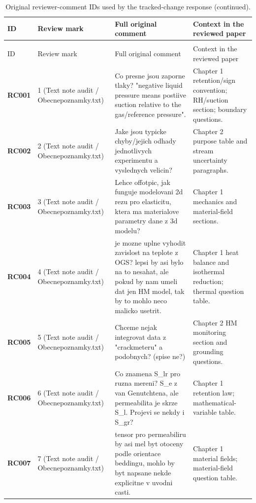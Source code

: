 \begin{longtable}{@{}L{0.10\textwidth} L{0.14\textwidth} L{0.31\textwidth} L{0.37\textwidth}@{}}
\caption{Original reviewer-comment IDs used by the tracked-change response.}\label{tab:original-review-comment-register}\\
\toprule
ID & Review mark & Full original comment & Context in the reviewed paper\\
\midrule
\endfirsthead
\caption[]{Original reviewer-comment IDs used by the tracked-change response (continued).}\\
\toprule
ID & Review mark & Full original comment & Context in the reviewed paper\\
\midrule
\endhead
\bottomrule
\endlastfoot
\textbf{RC001} & 1 (Text note audit / Obecnepoznamky.txt) & Co presne jsou zaporne tlaky? "negative liquid pressure means postiive suction relative to the gas/reference pressure". & Chapter 1 retention/sign convention; RH/suction section; boundary questions.\\
\addlinespace[0.16em]
\textbf{RC002} & 2 (Text note audit / Obecnepoznamky.txt) & Jake jsou typicke chyby/jejich odhady jednotlivych experimentu a vyslednych velicin? & Chapter 2 purpose table and stream uncertainty paragraphs.\\
\addlinespace[0.16em]
\textbf{RC003} & 3 (Text note audit / Obecnepoznamky.txt) & Lehce offotpic, jak funguje modelovani 2d rezu pro elasticitu, ktera ma materialove parametry dane z 3d modelu? & Chapter 1 mechanics and material-field sections.\\
\addlinespace[0.16em]
\textbf{RC004} & 4 (Text note audit / Obecnepoznamky.txt) & je mozne uplne vyhodit zavislost na teplote z OGS? lepsi by asi bylo na to nesahat, ale pokud by nam umeli dat jen HM model, tak by to mohlo neco malicko usetrit. & Chapter 1 heat balance and isothermal reduction; thermal question table.\\
\addlinespace[0.16em]
\textbf{RC005} & 5 (Text note audit / Obecnepoznamky.txt) & Chceme nejak integrovat data z "crackmeteru" a podobnych? (spise ne?) & Chapter 2 HM monitoring section and grounding questions.\\
\addlinespace[0.16em]
\textbf{RC006} & 6 (Text note audit / Obecnepoznamky.txt) & Co znamena S\_lr pro ruzna mereni? S\_e z van Genutchtena, ale permeabilita je skrze S\_l. Projevi se nekdy i S\_gr? & Chapter 1 retention law; mathematical-variable table.\\
\addlinespace[0.16em]
\textbf{RC007} & 7 (Text note audit / Obecnepoznamky.txt) & tensor pro permeabiliru by asi mel byt otoceny podle orientace beddingu, mohlo by byt napsane nekde explicitne v uvodni casti. & Chapter 1 material fields; material-field question table.\\

\end{longtable}
